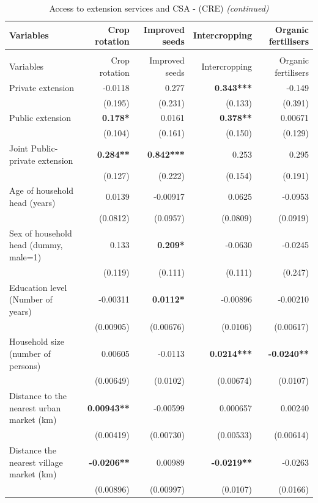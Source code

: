 \documentclass[
]{article}
\begin{document}
\begin{longtable}[t]{lrrrr}
\caption{\label{tab:unnamed-chunk-4}Access to extension services and CSA - (CRE)}\\
\toprule
Variables & Crop rotation & Improved seeds & Intercropping & Organic fertilisers\\
\midrule
\endfirsthead
\caption[]{\label{tab:unnamed-chunk-4}Access to extension services and CSA - (CRE) \textit{(continued)}}\\
\toprule
Variables & Crop rotation & Improved seeds & Intercropping & Organic fertilisers\\
\midrule
\endhead

\endfoot
\bottomrule
\endlastfoot
Private extension & -0.0118 & 0.277 & \textbf{0.343***} & -0.149\\
 & (0.195) & (0.231) & (0.133) & (0.391)\\
Public extension & \textbf{0.178*} & 0.0161 & \textbf{0.378**} & 0.00671\\
 & (0.104) & (0.161) & (0.150) & (0.129)\\
Joint Public-private extension & \textbf{0.284**} & \textbf{0.842***} & 0.253 & 0.295\\
 & (0.127) & (0.222) & (0.154) & (0.191)\\
Age of household head (years) & 0.0139 & -0.00917 & 0.0625 & -0.0953\\
 & (0.0812) & (0.0957) & (0.0809) & (0.0919)\\
Sex of household head (dummy, male=1) & 0.133 & \textbf{0.209*} & -0.0630 & -0.0245\\
 & (0.119) & (0.111) & (0.111) & (0.247)\\
Education level (Number of years) & -0.00311 & \textbf{0.0112*} & -0.00896 & -0.00210\\
 & (0.00905) & (0.00676) & (0.0106) & (0.00617)\\
Household size (number of persons) & 0.00605 & -0.0113 & \textbf{0.0214***} & \textbf{-0.0240**}\\
 & (0.00649) & (0.0102) & (0.00674) & (0.0107)\\
Distance to the nearest urban market (km) & \textbf{0.00943**} & -0.00599 & 0.000657 & 0.00240\\
 & (0.00419) & (0.00730) & (0.00533) & (0.00614)\\
Distance the nearest village market (km) & \textbf{-0.0206**} & 0.00989 & \textbf{-0.0219**} & -0.0263\\
 & (0.00896) & (0.00997) & (0.0107) & (0.0166)\\

\end{longtable}
\end{document}
